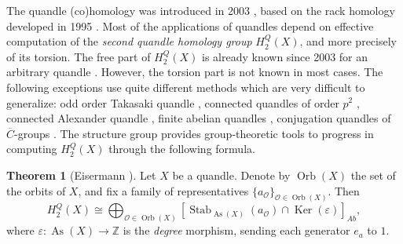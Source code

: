 \documentclass[a4paper,11pt]{amsart}
\theoremstyle{definition}
\newtheorem{thm}{Theorem}
\newcommand{\Z}{{\mathbb Z}}
\DeclareMathOperator{\Ker}{Ker}
\DeclareMathOperator{\Stab}{Stab}
\DeclareMathOperator{\As}{As}
\DeclareMathOperator{\Orb}{Orb}
\begin{document}
The quandle (co)homology was introduced in 2003  \cite{carterQuandleCohomologyStatesum2003}, based on the rack homology developed in 1995 \cite{fennTrunksClassifyingSpaces1995}.
Most of the applications of quandles depend on effective computation of the \emph{second quandle homology group} $H_2^Q(X)$, and more precisely of its torsion.
The free part of $H_2^Q(X)$ is already known since 2003 for an arbitrary quandle \cite{etingofRackCohomology2003,litherlandBettiNumbersFinite2003}.
However, the torsion part is not known in most cases.
The following exceptions use quite different methods which are very difficult to generalize: odd order Takasaki quandle  \cite{niebrzydowskiSecondQuandleHomology2011}, connected quandles of order $p^2$ \cite{iglesiasExplicitDescriptionSecond2017}, connected Alexander quandle \cite{clauwensAdjointGroupAlexander2010,bakshiSchurMultipliersSecond2020}, finite abelian quandles \cite{lebedAbelianQuandlesQuandles2021}, conjugation quandles of $\overline{C}$-groups \cite{lebedConjugationGroupsStructure2024}.
The structure group provides group-theoretic tools to progress in computing $H_2^Q(X)$ through the following formula.
\begin{thm}[Eisermann \cite{eisermannQuandleCoveringsTheir2014}]
Let $X$ be a quandle.
Denote by $\Orb(X)$ the set of the orbits of $X$, and fix a family of representatives $\{a_{\mathcal{O}} \}_{\mathcal{O}\in \Orb(X)}$. Then
\begin{equation}\label{thm:eisermann}
H_2^Q(X) \cong \bigoplus_{\mathcal{O}\in \Orb(X)} \left[\Stab_{\As(X)}(a_\mathcal{O})\cap \Ker(\varepsilon) \right]_{Ab},
\end{equation}
where $\varepsilon\colon\As(X) \to \Z$ is the \emph{degree} morphism, sending each generator $e_a$ to $1$.
\end{thm}
\end{document}
